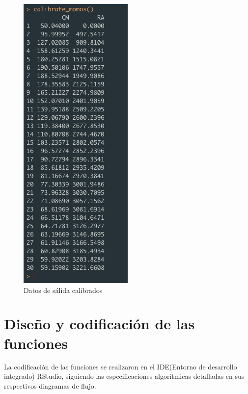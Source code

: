 \begin{figure}[H]
    \centering
      \begin{minipage}{0.75\textwidth}
        \centering
        \includegraphics[width=0.5\textwidth]{figure_4_8.png}
        \caption{Datos de s\'alida calibrados}
        \label{fig:Fig}
      \end{minipage}%
      \hspace{5mm}
\end{figure}

\section{Dise\~no y codificaci\'on de las funciones}

La codificaci\'on de las funciones se realizaron en el IDE(Entorno de desarrollo integrado) RStudio, siguiendo las especificaciones algor\'itmicas detalladas en sus respectivos diagramas de flujo.

